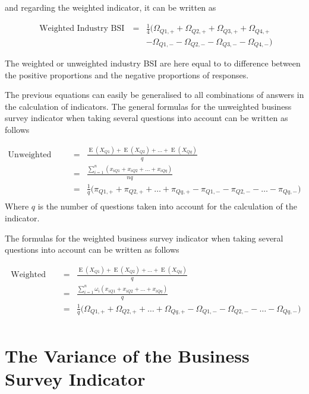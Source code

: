 \documentclass[12pt,a4paper,oneside]{book}
\DeclareMathOperator{\E}{E}
\begin{document}
and regarding the weighted indicator, it can be written as

\begin{eqnarray}
    \mbox{ Weighted Industry BSI}\ &=& \frac{1}{4} \big( \Omega_{Q1,+} + \Omega_{Q2,+} + \Omega_{Q3,+} + \Omega_{Q4,+} \nonumber \\
    && - \Omega_{Q1,-} - \Omega_{Q2,-} - \Omega_{Q3,-} - \Omega_{Q4,-} \big) 
\end{eqnarray}

The weighted or unweighted industry BSI are here equal to to difference between the positive proportions and the negative proportions of responses.


The previous equations can easily be generalised to all combinations of answers in the calculation of indicators.
The general formulas for the unweighted business survey indicator when taking several questions into account can be written as follows

\begin{eqnarray}
    \mbox{Unweighted BSI} &=& \frac{\E(X_{Q1}) + \E(X_{Q2}) + \ldots + \E(X_{Qq})}{q} \\
    &=& \frac{\sum^n_{i=1}( x_{iQ1} + x_{iQ2} + \ldots + x_{iQq})}{nq} \\
    &=& \frac{1}{q} \big( \pi_{Q1,+} +  \pi_{Q2,+} + \ldots +  \pi_{Qq,+}  -  \pi_{Q1,-} -  \pi_{Q2,-} - \ldots - \pi_{Qq,-} \big) \nonumber\\
\end{eqnarray}
Where $q$ is the number of questions taken into account for the calculation of the indicator.

The formulas for the weighted business survey indicator when taking several questions into account can be written as follows

\begin{eqnarray}
    \mbox{ Weighted BSI} &=& \frac{\E(X_{Q1}) + \E(X_{Q2}) + \ldots + \E(X_{Qq})}{q} \\
    &=& \frac{\sum^n_{i=1} \omega_i \left( x_{iQ1} + x_{iQ2} +\ldots + x_{iQq} \right)}{q} \\    
    &=& \frac{1}{q} \big( \Omega_{Q1,+} + \Omega_{Q2,+} + \ldots + \Omega_{Qq,+} - \Omega_{Q1,-} - \Omega_{Q2,-} - \ldots - \Omega_{Qq,-} \big) \nonumber\\
\end{eqnarray}





\chapter{The Variance of the Business Survey Indicator}
\end{document}
